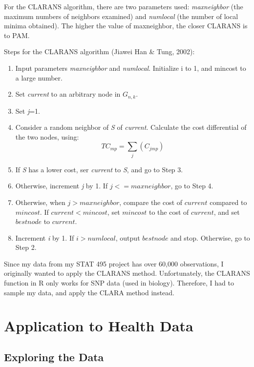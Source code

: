 \documentclass[12pt,twoside]{amherstthesis}
\providecommand{\tightlist}{%
  \setlength{\itemsep}{0pt}\setlength{\parskip}{0pt}}
\begin{document}
  For the CLARANS algorithm, there are two parameters used:
  \emph{maxneighbor} (the maximum numbers of neighbors examined) and
  \emph{numlocal} (the number of local minima obtained). The higher the
  value of maxneighbor, the closer CLARANS is to PAM.
  
  Steps for the CLARANS algorithm (Jiawei Han \& Tung, 2002):
  
  \begin{enumerate}
  \def\labelenumi{\arabic{enumi}.}
  \tightlist
  \item
    Input parameters \emph{maxneighbor} and \emph{numlocal}. Initialize i
    to 1, and mincost to a large number.
  \item
    Set \emph{current} to an arbitrary node in \(G_{n,k}\).
  \item
    Set \emph{j}=1.
  \item
    Consider a random neighbor of \emph{S} of \emph{current}. Calculate
    the cost differential of the two nodes, using:
    \[ TC_{mp} = \sum_j(C_{jmp}) \]
  \item
    If \emph{S} has a lower cost, ser \emph{current} to \emph{S}, and go
    to Step 3.
  \item
    Otherwise, increment \emph{j} by 1. If \(j <= maxneighbor\), go to
    Step 4.
  \item
    Otherwise, when \(j > maxneighbor\), compare the cost of \(current\)
    compared to \(mincost\). If \(current < mincost\), set \(mincost\) to
    the cost of \(current\), and set \(bestnode\) to \(current\).
  \item
    Increment \emph{i} by 1. If \(i> numlocal\), output \(bestnode\) and
    stop. Otherwise, go to Step 2.
  \end{enumerate}
  
  Since my data from my STAT 495 project has over 60,000 observations, I
  originally wanted to apply the CLARANS method. Unfortunately, the
  CLARANS function in R only works for SNP data (used in biology).
  Therefore, I had to sample my data, and apply the CLARA method instead.
  
  \chapter{Application to Health Data}\label{typeset-equ}
  
  \section{Exploring the Data}\label{exploring-the-data}
  
\end{document}
